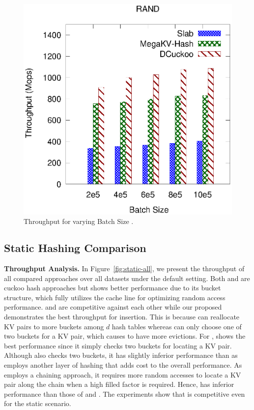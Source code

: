 \begin{figure}[htp]
\begin{minipage}{0.19\linewidth}
		\centerline{\dsali}
	\end{minipage}
	\begin{minipage}{0.19\linewidth}\centering
		\includegraphics[width=\linewidth]{pic/dynamic/batch/dynamic_random.eps}
		\centerline{\dsrandom}
	\end{minipage}
	\caption{Throughput for varying Batch Size .}
	\label{fig:vary-batch-size}
\end{figure}

\subsection{Static Hashing Comparison}\label{sec:exp:static}

\vspace{1mm}\noindent\textbf{Throughput Analysis.} In Figure~\ref{fig:static-all}, we present the throughput of all compared approaches over all datasets under the default setting.
Both \megakv and \cudpp are cuckoo hash approaches but \megakv shows better performance due to its bucket structure, which fully utilizes the cache line for optimizing random access performance.
\megakv and \slab are competitive against each other
while our proposed \voter demonstrates the best throughput for insertion. This is because \voter can reallocate KV pairs to more buckets among $d$ hash tables whereas \megakv can only choose one of two buckets for a KV pair, which causes \megakv to have more evictions. For , \megakv shows the best performance since it simply checks two buckets for locating a KV pair.
Although \voter also checks two buckets, it has slightly inferior performance than \megakv as \voter employs another layer of hashing that adds cost to the overall performance. 
As \slab employs a chaining approach, it requires more random accesses to locate a KV pair along the chain when a high filled factor is required. Hence, \slab has inferior performance than those of \megakv and \voter.
The experiments show that \voter is competitive even for the static scenario.

